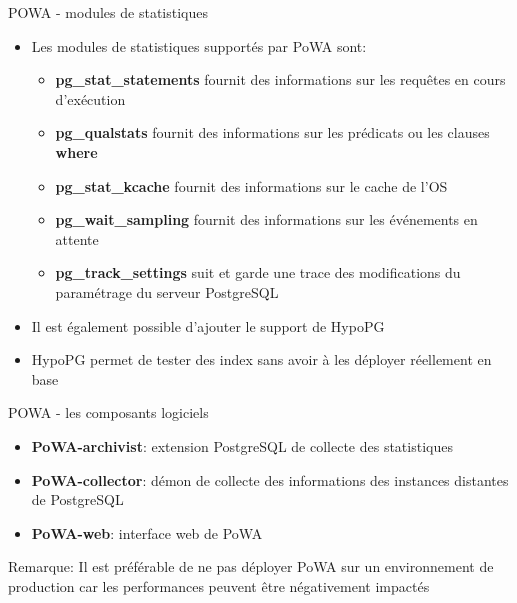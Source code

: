 
\begin{frame}{POWA - modules de statistiques}

   \begin{itemize}
      \item Les modules de statistiques supportés par PoWA sont:
      \begin{itemize}
         \item \textbf{pg\_stat\_statements} fournit des informations sur les requêtes en cours d'exécution
         \item \textbf{pg\_qualstats} fournit des informations sur les prédicats ou les clauses \textbf{where}
         \item \textbf{pg\_stat\_kcache} fournit des informations sur le cache de l'OS
         \item \textbf{pg\_wait\_sampling} fournit des informations sur les événements en attente
         \item \textbf{pg\_track\_settings} suit et garde une trace des modifications du paramétrage du serveur PostgreSQL
      \end{itemize}
      \item Il est également possible d'ajouter le support de HypoPG
      \item HypoPG permet de tester des index sans avoir à les déployer réellement en base
   \end{itemize}

\end{frame}


\begin{frame}{POWA - les composants logiciels}

   \begin{itemize}
      \item \textbf{PoWA-archivist}: extension PostgreSQL de collecte des statistiques
      \item \textbf{PoWA-collector}: démon de collecte des informations des instances distantes de PostgreSQL
      \item \textbf{PoWA-web}: interface web de PoWA
   \end{itemize}

   Remarque: Il est préférable de ne pas déployer PoWA sur un environnement de production car les performances peuvent être négativement impactés

\end{frame}

